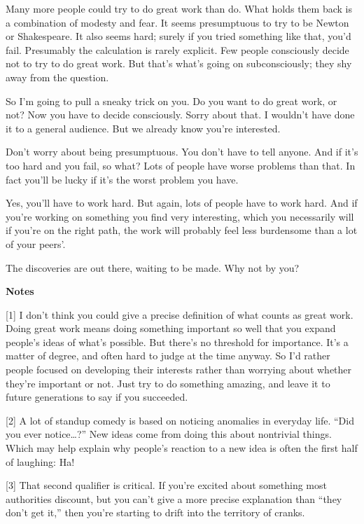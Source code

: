 Many more people could try to do great work than do. What holds them
back is a combination of modesty and fear. It seems presumptuous to try
to be Newton or Shakespeare. It also seems hard; surely if you tried
something like that, you'd fail. Presumably the calculation is rarely
explicit. Few people consciously decide not to try to do great work. But
that's what's going on subconsciously; they shy away from the question.

So I'm going to pull a sneaky trick on you. Do you want to do great
work, or not? Now you have to decide consciously. Sorry about that. I
wouldn't have done it to a general audience. But we already know you're
interested.

Don't worry about being presumptuous. You don't have to tell anyone. And
if it's too hard and you fail, so what? Lots of people have worse
problems than that. In fact you'll be lucky if it's the worst problem
you have.

Yes, you'll have to work hard. But again, lots of people have to work
hard. And if you're working on something you find very interesting,
which you necessarily will if you're on the right path, the work will
probably feel less burdensome than a lot of your peers'.

The discoveries are out there, waiting to be made. Why not by you?

\textbf{Notes}

{[}1{]} I don't think you could give a precise definition of what counts
as great work. Doing great work means doing something important so well
that you expand people's ideas of what's possible. But there's no
threshold for importance. It's a matter of degree, and often hard to
judge at the time anyway. So I'd rather people focused on developing
their interests rather than worrying about whether they're important or
not. Just try to do something amazing, and leave it to future
generations to say if you succeeded.

{[}2{]} A lot of standup comedy is based on noticing anomalies in
everyday life. ``Did you ever notice\ldots?'' New ideas come from doing
this about nontrivial things. Which may help explain why people's
reaction to a new idea is often the first half of laughing: Ha!

{[}3{]} That second qualifier is critical. If you're excited about
something most authorities discount, but you can't give a more precise
explanation than ``they don't get it,'' then you're starting to drift
into the territory of cranks.

